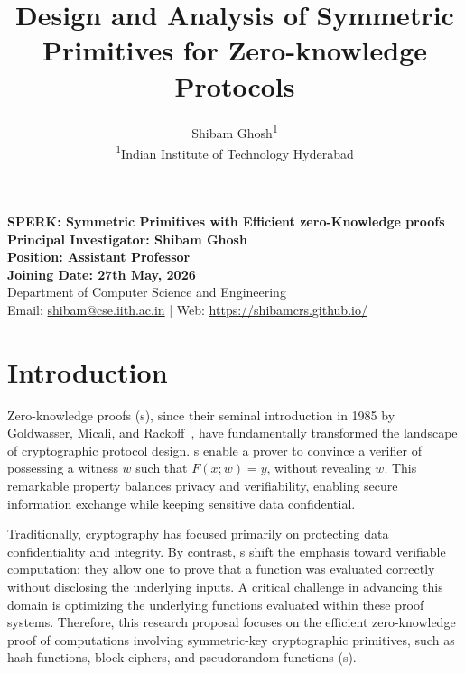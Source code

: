 
\newcommand{\soptitle}{Design and Analysis of Symmetric Primitives for Zero-knowledge Protocols}

\title{\sffamily\bfseries\Large\textcolor{theme}{\soptitle}}\par
\author{
	Shibam Ghosh\textsuperscript{1}\\[1ex]
	\normalsize \textsuperscript{1}Indian Institute of Technology Hyderabad 
}

\date{} %


	\begin{tcolorbox}[
		colback=headerbg,
		colframe=headerbg,
		boxrule=0pt,
		width=\textwidth,
		arc=0mm,
		left=6pt,
		right=6pt,
		top=6pt,
		bottom=6pt
		]
		\centering
		{\LARGE \textbf{SPERK: Symmetric Primitives with Efficient zero-Knowledge proofs}}\\[6pt]
		
		{\large \textbf{Principal Investigator: Shibam Ghosh}}\\
		{\large \textbf{Position: Assistant Professor}}\\ 
		{\large \textbf{Joining Date: 27th May, 2026}}\\ 
		{\large Department of Computer Science and Engineering}\\[4pt]
		
		Email: \href{mailto:shibam@cse.iith.ac.in}{shibam@cse.iith.ac.in}
		\;|\;
		Web: \href{https://shibamcrs.github.io/}{https://shibamcrs.github.io/}
	\end{tcolorbox}
	
	\vspace{8pt}
	
	\section{Introduction}
	Zero-knowledge proofs (s), since their seminal introduction in 1985 by Goldwasser, Micali, and Rackoff~\cite{DBLP:conf/stoc/GoldwasserMR85}, have fundamentally transformed the landscape of cryptographic protocol design.
	s enable a prover to convince a verifier of possessing a witness $w$ such that $F(x; w) = y$, without revealing $w$.
	This remarkable property balances privacy and verifiability, enabling secure information exchange while keeping sensitive data confidential. 
	
	Traditionally, cryptography has focused primarily on protecting data confidentiality and integrity.
	By contrast, s shift the emphasis toward verifiable computation: they allow one to prove that a function was evaluated correctly without disclosing the underlying inputs.
	A critical challenge in advancing this domain is optimizing the underlying functions evaluated within these proof systems.
	Therefore, this research proposal focuses on the efficient zero-knowledge proof of computations involving symmetric-key cryptographic primitives, such as hash functions, block ciphers, and pseudorandom functions (s).
	
